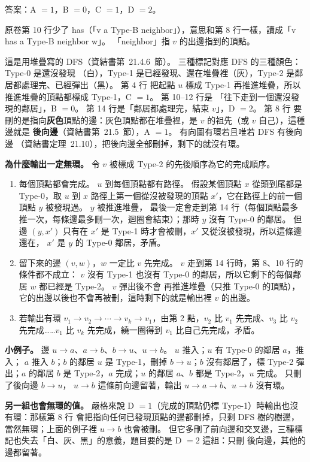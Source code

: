 \begin{pastsoln}
答案：A $= 1$，B $= 0$，C $= 1$，D $= 2$。

原卷第 10 行少了 has（「v a Type-B neighbor」），意思和第 8 行一樣，讀成「v has a Type-B
neighbor w」。 「neighbor」指 $v$ 的出邊指到的頂點。

這是用堆疊寫的 DFS（資結書第~21.4.6~節）。 三種標記對應 DFS 的三種顏色：Type-0 是還沒發現
（白），Type-1 是已經發現、還在堆疊裡（灰），Type-2 是鄰居都處理完、已經彈出（黑）。 第 4 行
把起點 $u$ 標成 Type-1 再推進堆疊，所以推進堆疊的頂點都標成 Type-1，C $= 1$。 第 10--12 行是
「往下走到一個還沒發現的鄰居」，B $= 0$。 第 14 行是「鄰居都處理完，結束 $v$」，D $= 2$。 第 8 行
要刪的是指向\textbf{灰色}頂點的邊：灰色頂點都在堆疊裡，是 $v$ 的祖先（或 $v$ 自己），這種邊就是
\textbf{後向邊}（資結書第~21.5~節），A $= 1$。 有向圖有環若且唯若 DFS 有後向邊
（資結書定理~21.10），把後向邊全部刪掉，剩下的就沒有環。

\textbf{為什麼輸出一定無環。} 令 $v$ 被標成 Type-2 的先後順序為它的完成順序。
\begin{enumerate}
\item 每個頂點都會完成。 $u$ 到每個頂點都有路徑。 假設某個頂點 $x$ 從頭到尾都是 Type-0，取 $u$
到 $x$ 路徑上第一個從沒被發現的頂點 $x'$，它在路徑上的前一個頂點 $y$ 被發現過。 $y$ 被推進堆疊，
最後一定會走到第 14 行（每個頂點最多推一次，每條邊最多刪一次，迴圈會結束）；那時 $y$ 沒有
Type-0 的鄰居。 但邊 $(y, x')$ 只有在 $x'$ 是 Type-1 時才會被刪，$x'$ 又從沒被發現，所以這條邊還在，
$x'$ 是 $y$ 的 Type-0 鄰居，矛盾。
\item 留下來的邊 $(v, w)$，$w$ 一定比 $v$ 先完成。 $v$ 走到第 14 行時，第 8、10 行的條件都不成立：
$v$ 沒有 Type-1 也沒有 Type-0 的鄰居，所以它剩下的每個鄰居 $w$ 都已經是 Type-2。 $v$ 彈出後不會
再推進堆疊（只推 Type-0 的頂點），它的出邊以後也不會再被刪，這時剩下的就是輸出裡 $v$ 的出邊。
\item 若輸出有環 $v_1 \to v_2 \to \cdots \to v_k \to v_1$，由第 2 點，$v_2$ 比 $v_1$ 先完成、$v_3$ 比
$v_2$ 先完成……$v_1$ 比 $v_k$ 先完成，繞一圈得到 $v_1$ 比自己先完成，矛盾。
\end{enumerate}

\textbf{小例子。} 邊 $u \to a$、$a \to b$、$b \to u$、$u \to b$。 $u$ 推入；$u$ 有 Type-0 的鄰居 $a$，推入；
$a$ 推入 $b$；$b$ 的鄰居 $u$ 是 Type-1，刪掉 $b \to u$；$b$ 沒有鄰居了，標 Type-2 彈出；$a$ 的鄰居
$b$ 是 Type-2，$a$ 完成；$u$ 的鄰居 $a$、$b$ 都是 Type-2，$u$ 完成。 只刪了後向邊 $b \to u$，
$u \to b$ 這條前向邊留著，輸出 $u \to a \to b$、$u \to b$ 沒有環。

\textbf{另一組也會無環的值。} 嚴格來說 D $= 1$（完成的頂點仍標 Type-1）時輸出也沒有環：那樣第 8 行
會把指向任何已發現頂點的邊都刪掉，只剩 DFS 樹的樹邊，當然無環；上面的例子裡 $u \to b$ 也會被刪。
但它多刪了前向邊和交叉邊，三種標記也失去「白、灰、黑」的意義，題目要的是 D $= 2$ 這組：只刪
後向邊，其他的邊都留著。
\end{pastsoln}
